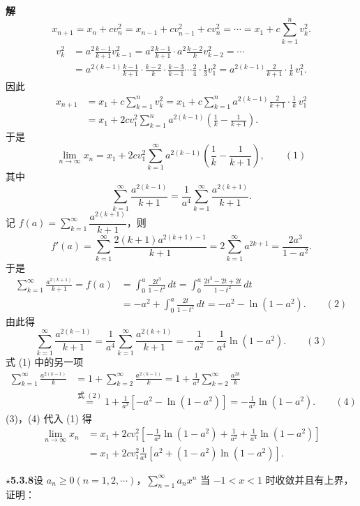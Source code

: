 \documentclass[UTF8, 12pt, fontset=fandol, oneside]{ctexart}
\begin{document}
\noindent\textbf{解}\quad
\[
  x_{n+1}=x_n+cv_n^2=x_{n-1}+cv_{n-1}^2+cv_n^2
  =\cdots=x_1+c\sum_{k=1}^n v_k^2.
\]
\[
\begin{aligned}
v_k^2
&=a^2\frac{k-1}{k+1}v_{k-1}^2
=a^2\frac{k-1}{k+1}\cdot a^2\frac{k-2}{k}v_{k-2}^2=\cdots\\
&=a^{2(k-1)}\frac{k-1}{k+1}\cdot\frac{k-2}{k}\cdot\frac{k-3}{k-1}\cdots\frac2{4}\cdot\frac1{3}v_1^2
=a^{2(k-1)}\frac2{k+1}\cdot\frac1k\,v_1^2.
\end{aligned}
\]
因此
\[
\begin{aligned}
x_{n+1}
&=x_1+c\sum_{k=1}^n v_k^2
=x_1+c\sum_{k=1}^n a^{2(k-1)}\frac2{k+1}\cdot\frac1k\,v_1^2\\
&=x_1+2cv_1^2\sum_{k=1}^n a^{2(k-1)}\left(\frac1k-\frac1{k+1}\right).
\end{aligned}
\]
于是
\[
  \lim_{n\to\infty}x_n
  =x_1+2cv_1^2\sum_{k=1}^{\infty}a^{2(k-1)}
  \left(\frac1k-\frac1{k+1}\right), \qquad(1)
\]
其中
\[
  \sum_{k=1}^{\infty}\frac{a^{2(k-1)}}{k+1}
  =\frac1{a^4}\sum_{k=1}^{\infty}\frac{a^{2(k+1)}}{k+1}.
\]
记 $f(a)=\displaystyle\sum_{k=1}^{\infty}\dfrac{a^{2(k+1)}}{k+1}$，则
\[
  f'(a)=\sum_{k=1}^{\infty}\frac{2(k+1)a^{2(k+1)-1}}{k+1}
  =2\sum_{k=1}^{\infty}a^{2k+1}
  =\frac{2a^3}{1-a^2}.
\]
于是
\[
\begin{aligned}
  \sum_{k=1}^{\infty}\frac{a^{2(k+1)}}{k+1}
  =f(a)
  &=\int_0^a\frac{2t^3}{1-t^2}\,dt
  =\int_0^a\frac{2t^3-2t+2t}{1-t^2}\,dt\\
  &=-a^2+\int_0^a\frac{2t}{1-t^2}\,dt
  =-a^2-\ln(1-a^2). \qquad(2)
\end{aligned}
\]
由此得
\[
  \sum_{k=1}^{\infty}\frac{a^{2(k-1)}}{k+1}
  =\frac1{a^4}\sum_{k=1}^{\infty}\frac{a^{2(k+1)}}{k+1}
  =-\frac1{a^2}-\frac1{a^4}\ln(1-a^2). \qquad(3)
\]
式 (1) 中的另一项
\[
\begin{aligned}
  \sum_{k=1}^{\infty}\frac{a^{2(k-1)}}k
  &=1+\sum_{k=2}^{\infty}\frac{a^{2(k-1)}}k
  =1+\frac1{a^2}\sum_{k=2}^{\infty}\frac{a^{2k}}k\\
  &\overset{\text{式 }(2)}{=}1+\frac1{a^2}\left[-a^2-\ln(1-a^2)\right]
  =-\frac1{a^2}\ln(1-a^2). \qquad(4)
\end{aligned}
\]
(3)，(4) 代入 (1) 得
\[
\begin{aligned}
  \lim_{n\to\infty}x_n
  &=x_1+2cv_1^2\left[-\frac1{a^2}\ln(1-a^2)+\frac1{a^2}
  +\frac1{a^4}\ln(1-a^2)\right]\\
  &=x_1+2cv_1^2\frac1{a^4}\left[a^2+(1-a^2)\ln(1-a^2)\right].
\end{aligned}
\]

\noindent\textbf{\(\star\)5.3.8}\quad 设 $a_n\ge0(n=1,2,\cdots)$，$\displaystyle\sum_{n=1}^{\infty}a_nx^n$ 当 $-1<x<1$ 时收敛并且有上界，证明：
\end{document}
